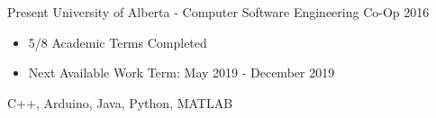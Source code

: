 
  

\begin{experiences}
    \experience
      {Present}   {University of Alberta - Computer Software Engineering Co-Op}{}{}
      {2016} {
                        \begin{itemize}
                          \item 5/8 Academic Terms Completed
                          \item Next Available Work Term: May 2019 - December 2019
                        \end{itemize}
                      }
                      {
                        C++,
                        Arduino,
                        Java,
                        Python,
                        MATLAB
                      }
  
  \end{experiences}